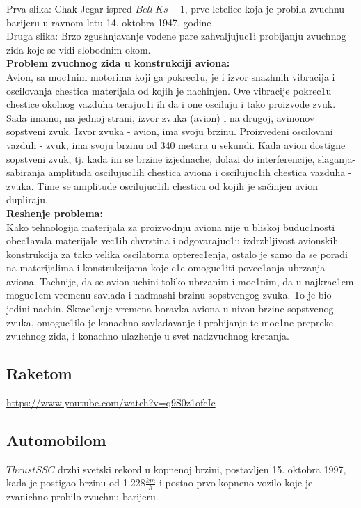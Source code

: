 \documentclass[11pt]{article}
\newcommand\eng{\fontencoding{OT1}\fontfamily{\rmdefault}\selectfont}
\newcommand\srb{\fontencoding{OT2}\fontfamily{\rmdefault}\selectfont}
\begin{document}
Prva slika: Chak Jegar ispred $Bell\ Ks-1$, prve letelice koja je probila zvuchnu barijeru u ravnom letu 14. oktobra 1947. godine\\
Druga slika: Brzo zgushnjavanje vodene pare zahvaljujuc1i probijanju zvuchnog zida koje se vidi slobodnim okom.\\

\textbf{Problem zvuchnog zida u konstrukciji aviona:}\\
Avion, sa moc1nim motorima koji ga pokrec1u, je i izvor snazhnih vibracija i oscilovanja chestica materijala od kojih je nachinjen. Ove vibracije pokrec1u chestice okolnog vazduha terajuc1i ih da i one osciluju i tako proizvode zvuk. Sada imamo, na jednoj strani, izvor zvuka (avion) i na drugoj, avinonov sopstveni zvuk. Izvor zvuka - avion, ima svoju brzinu. Proizvedeni oscilovani vazduh - zvuk, ima svoju brzinu od 340 metara u sekundi. Kada avion dostigne sopstveni zvuk, tj. kada im se brzine izjednache, dolazi do interferencije, slaganja-sabiranja amplituda oscilujuc1ih chestica aviona i oscilujuc1ih chestica vazduha - zvuka. Time se amplitude oscilujuc1ih chestica od kojih je sačinjen avion dupliraju.\\

\textbf{Reshenje problema:}\\
Kako tehnologija materijala za proizvodnju aviona nije u bliskoj buduc1nosti obec1avala materijale vec1ih chvrstina i odgovarajuc1u izdrzhljivost avionskih konstrukcija za tako velika oscilatorna opterec1enja, ostalo je samo da se poradi na materijalima i konstrukcijama koje c1e omoguc1iti povec1anja ubrzanja aviona. Tachnije, da se avion uchini toliko ubrzanim i moc1nim, da u najkrac1em moguc1em vremenu savlada i nadmashi brzinu sopstvengog zvuka. To je bio jedini nachin. Skrac1enje vremena boravka aviona u nivou brzine sopstvenog zvuka, omoguc1ilo je konachno savladavanje i probijanje te moc1ne prepreke - zvuchnog zida, i konachno ulazhenje u svet nadzvuchnog kretanja. 

\subsection{Raketom}
\eng\url{https://www.youtube.com/watch?v=q9S0z1ofcIc}\srb

\subsection{Automobilom}
$ThrustSSC$ drzhi svet\/ski rekord u kopnenoj brzini, postavljen 15. oktobra 1997, kada je postigao brzinu od 1.228$\frac{km}{h}$ i postao prvo kopneno vozilo koje je zvanichno probilo zvuchnu barijeru.\\
\end{document}
